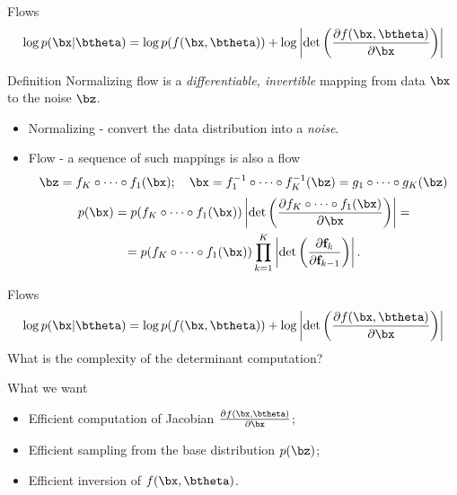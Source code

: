 \begin{frame}{Flows}
	\[
	\log p(\bx|\btheta) = \log p(f(\bx, \btheta)) + \log \left|\det \left( \frac{\partial f(\bx, \btheta)}{\partial \bx} \right) \right|
	\]
	\begin{block}{Definition}
		Normalizing flow is a \textit{differentiable, invertible} mapping from data $\bx$ to the noise $\bz$. 
	\end{block}
	\begin{itemize}
		\item Normalizing - convert the data distribution into a \textit{noise}.
		\item Flow - a sequence of such mappings is also a flow
		\[
		\bz = f_K \circ \dots \circ f_1(\bx); \quad \bx = f_1^{-1} \circ \dots \circ f_K^{-1} (\bz) = g_1 \circ \dots \circ g_K(\bz) 
		\] 
		\begin{multline*}
			p(\bx) = p(f_K \circ \dots \circ f_1(\bx)) \left|\det \left(\frac{\partial f_K \circ \dots \circ f_1(\bx)}{\partial \bx} \right) \right| = \\
			= p(f_K \circ \dots \circ f_1(\bx)) \prod_{k=1}^K \left|\det \left(\frac{\partial \mathbf{f}_k}{\partial \mathbf{f}_{k-1}} \right) \right|.
		\end{multline*}
	\end{itemize}
\end{frame}
\begin{frame}{Flows}
	\[
	\log p(\bx|\btheta) = \log p(f(\bx, \btheta)) + \log \left|\det \left( \frac{\partial f(\bx, \btheta)}{\partial \bx} \right) \right|
	\]
	What is the complexity of the determinant computation?
	\begin{block}{What we want}
		\begin{itemize}
			\item Efficient computation of Jacobian $\frac{\partial f(\bx, \btheta)}{\partial \bx}$;
			\item Efficient sampling from the base distribution $p(\bz)$;
			\item Efficient inversion of $f(\bx, \btheta)$.
		\end{itemize}
		
	\end{block}
	
\end{frame}
